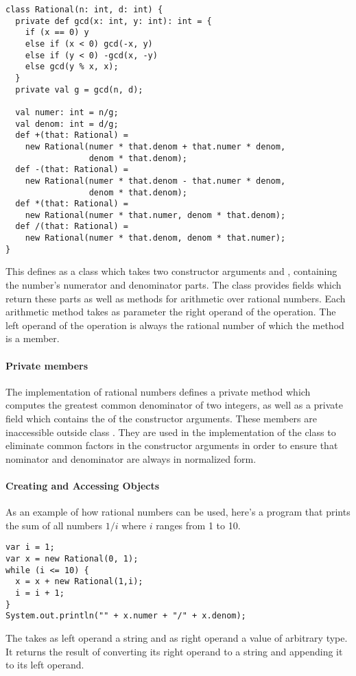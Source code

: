 \documentclass[a4paper,12pt,twoside,titlepage]{book}
\begin{document}
\begin{lstlisting}
class Rational(n: int, d: int) {
  private def gcd(x: int, y: int): int = {
    if (x == 0) y
    else if (x < 0) gcd(-x, y)
    else if (y < 0) -gcd(x, -y)
    else gcd(y % x, x);
  }
  private val g = gcd(n, d);

  val numer: int = n/g;
  val denom: int = d/g;
  def +(that: Rational) =
    new Rational(numer * that.denom + that.numer * denom,
                 denom * that.denom);
  def -(that: Rational) =
    new Rational(numer * that.denom - that.numer * denom, 
                 denom * that.denom);
  def *(that: Rational) =
    new Rational(numer * that.numer, denom * that.denom);
  def /(that: Rational) =
    new Rational(numer * that.denom, denom * that.numer);
}
\end{lstlisting}
This defines  as a class which takes two constructor
arguments  and , containing the number's numerator and
denominator parts.  The class provides fields which return these parts
as well as methods for arithmetic over rational numbers.  Each
arithmetic method takes as parameter the right operand of the
operation. The left operand of the operation is always the rational
number of which the method is a member.

\paragraph{Private members}
The implementation of rational numbers defines a private method
 which computes the greatest common denominator of two
integers, as well as a private field  which contains the
 of the constructor arguments. These members are inaccessible
outside class . They are used in the implementation of
the class to eliminate common factors in the constructor arguments in
order to ensure that nominator and denominator are always in
normalized form.

\paragraph{Creating and Accessing Objects}
As an example of how rational numbers can be used, here's a program
that prints the sum of all numbers $1/i$ where $i$ ranges from 1 to 10.
\begin{lstlisting}
var i = 1;
var x = new Rational(0, 1);
while (i <= 10) {
  x = x + new Rational(1,i);
  i = i + 1;
}
System.out.println("" + x.numer + "/" + x.denom);
\end{lstlisting}
The \code{+} takes as left operand a string and as right operand a
value of arbitrary type. It returns the result of converting its right
operand to a string and appending it to its left operand. 
  
\end{document}
